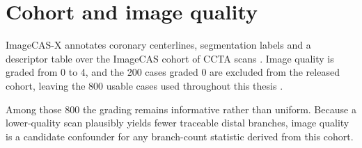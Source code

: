 
\section{Cohort and image quality}
\label{sec:dataset-cohort}

ImageCAS-X annotates coronary centerlines, segmentation labels and a descriptor table over the
ImageCAS cohort of CCTA scans \cite{zeng2023imagecas,bransby2026imagecasx}.
Image quality is graded from 0 to 4, and the 200 cases graded 0 are excluded from the released
cohort, leaving the 800 usable cases used throughout this thesis \cite{bransby2026imagecasx}.

Among those 800 the grading remains informative rather than uniform.
Because a lower-quality scan plausibly yields fewer traceable distal branches, image quality is a
candidate confounder for any branch-count statistic derived from this cohort.
